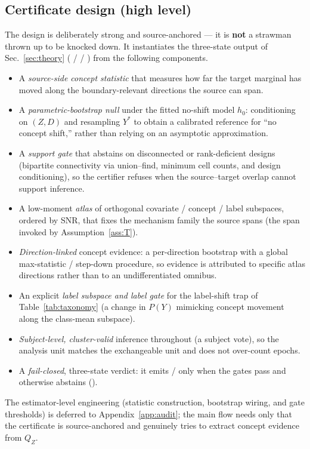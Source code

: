 \subsection{Certificate design (high level)}
The design is deliberately strong and source-anchored --- it is \textbf{not} a strawman thrown up to be
knocked down. It instantiates the three-state output of Sec.~\ref{sec:theory} (\stcov{} / \stsus{} / \stunid{})
from the following components. 
\begin{itemize}
  \item A \emph{source-side concept statistic} that measures how far the target marginal has moved along the
  boundary-relevant directions the source can span.
  \item A \emph{parametric-bootstrap null} under the fitted no-shift model $h_0$: conditioning on $(Z,D)$ and
  resampling $Y^\ast$ to obtain a calibrated reference for ``no concept shift,'' rather than relying on an
  asymptotic approximation.
  \item A \emph{support gate} that abstains on disconnected or rank-deficient designs (bipartite connectivity
  via union--find, minimum cell counts, and design conditioning), so the certifier refuses when the
  source--target overlap cannot support inference.
  \item A low-moment \emph{atlas} of orthogonal covariate / concept / label subspaces, ordered by SNR, that
  fixes the mechanism family the source spans (the span invoked by Assumption~\ref{ass:T}).
  \item \emph{Direction-linked} concept evidence: a per-direction bootstrap with a global max-statistic /
  step-down procedure, so evidence is attributed to specific atlas directions rather than to an undifferentiated
  omnibus.
  \item An explicit \emph{label subspace and label gate} for the label-shift trap of Table~\ref{tab:taxonomy}
  (a change in $P(Y)$ mimicking concept movement along the class-mean subspace).
  \item \emph{Subject-level, cluster-valid} inference throughout (a subject vote), so the analysis unit matches
  the exchangeable unit and does not over-count epochs.
  \item A \emph{fail-closed}, three-state verdict: it emits \stcov{}/\stsus{} only when the gates pass and
  otherwise abstains (\stunid{}).
\end{itemize}
The estimator-level engineering (statistic construction, bootstrap wiring, and gate thresholds) is deferred to
Appendix~\ref{app:audit}; the main flow needs only that the certificate is source-anchored and genuinely
tries to extract concept evidence from $Q_Z$.

